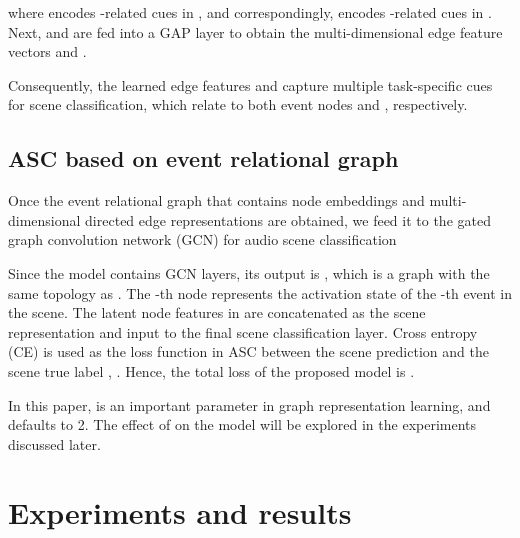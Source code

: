 \documentclass{article}
\begin{document}
where  encodes -related cues in , and correspondingly,  encodes -related cues in . Next,  and  are fed into a GAP layer to obtain the multi-dimensional edge feature vectors  and .
 
Consequently, the learned edge features  and  capture multiple task-specific cues for scene classification, which relate to both event nodes  and , respectively.


















\vspace{-0.4cm}
\subsection{ASC based on event relational graph}





Once the event relational graph that contains  node embeddings  and  multi-dimensional directed edge representations  are obtained, we feed it to the gated graph convolution network (GCN) \cite{gated_GCN} for audio scene classification



Since the model contains  GCN layers, its output is , which is a graph with the same topology as .  
The -th node represents the activation state of the -th event in the scene. The latent node features in  are concatenated as the scene representation and input to the final scene classification layer.
Cross entropy (CE) is used as the loss function in ASC between the scene prediction  and the scene true label ,
. 
Hence, the total loss of the proposed model is . 




In this paper,  is an important parameter in graph representation learning, and  defaults to 2. The effect of  on the model will be explored in the experiments discussed later.


\vspace{-0.2cm}
\section{Experiments and results}
\label{sec:experiments}

\vspace{-0.2cm}
\end{document}
